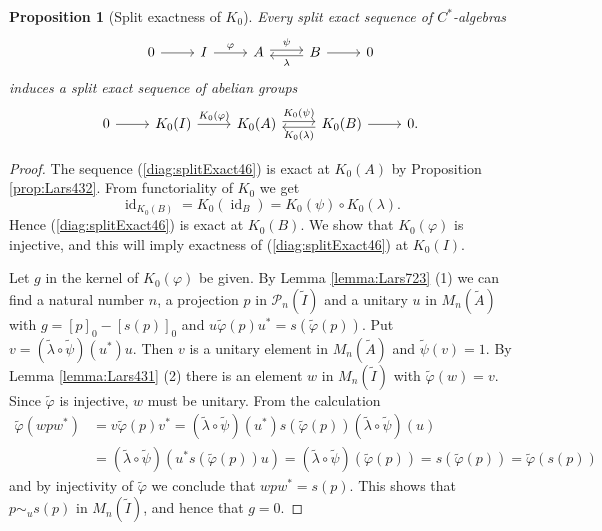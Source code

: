 \documentclass{book}
\newtheorem{proposition}[definition]{Proposition}
\def\cstars{\(C^*\)-algebras}
\begin{document}
\begin{proposition}[Split exactness of \(K_0\)]\label{prop:Lars433}
  Every split exact sequence of \cstars
  \begin{equation*}
    \begin{tikzcd}
      0 \arrow[r]&I\arrow[r,"\varphi"] & A\arrow[r, shift left=2pt, "\psi"]
      &B\arrow[l, shift left=2pt, "\lambda"]\arrow[r]&0
    \end{tikzcd}
  \end{equation*}  
  induces a split exact sequence of abelian groups
  \begin{equation}\label{diag:splitExact46}
    \begin{tikzcd}
      0 \arrow[r]&K_0(I)\arrow[r,"K_0(\varphi)"] & K_0(A)\arrow[r, shift left=2pt, "K_0(\psi)"]
      &K_0(B)\arrow[l, shift left=2pt, "K_0(\lambda)"]\arrow[r]&0.
    \end{tikzcd}
  \end{equation}
\end{proposition}
\begin{proof}
  The sequence (\ref{diag:splitExact46}) is exact at \(K_0(A)\) by Proposition \ref{prop:Lars432}. From 
  functoriality of \(K_0\) we get
  \[
    \operatorname{id}_{K_0(B)}=K_0(\operatorname{id}_B)=K_0(\psi)\circ K_0(\lambda).
  \]
  Hence (\ref{diag:splitExact46}) is exact at \(K_0(B)\). We show that \(K_0(\varphi)\) is injective, and this will imply exactness of (\ref{diag:splitExact46}) at \(K_0(I)\).\par
  Let \(g\) in the kernel of \(K_0(\varphi)\) be given. By Lemma \ref{lemma:Lars723} (1) we can find a natural number \(n\),
  a projection \(p\) in \(\mathcal{P}_n(\tilde{I})\) and a unitary \(u\) in \(M_n(\tilde{A})\) with 
  \(g={[p]}_0-{[s(p)]}_0\) and \(u\tilde{\varphi}(p)u^*=s(\tilde{\varphi}(p))\).
  Put \(v=(\tilde{\lambda}\circ\tilde{\psi})(u^*)u\). Then \(v\) is a unitary element in \(M_n(\tilde{A})\) and
  \(\tilde{\psi}(v)=1\). By Lemma \ref{lemma:Lars431} (2) there is an element \(w\) in \(M_n(\tilde{I})\) with
  \(\tilde{\varphi}(w)=v\). Since \(\tilde{\varphi}\) is injective, \(w\) must be unitary. From the calculation
  \begin{align*}
    \tilde{\varphi}(wpw^*)&=v\tilde{\varphi}(p)v^*=(\tilde{\lambda}\circ\tilde{\psi})(u^*)s(\tilde{\varphi}(p))(\tilde{\lambda}\circ\tilde{\psi})(u)\\
    &=(\tilde{\lambda}\circ\tilde{\psi})(u^*s(\tilde{\varphi}(p))u)=(\tilde{\lambda}\circ\tilde{\psi})(\tilde{\varphi}(p))=s(\tilde{\varphi}(p))=\tilde{\varphi}(s(p))
  \end{align*}
  and by injectivity of \(\tilde{\varphi}\) we conclude that \(wpw^*=s(p)\). This shows that \(p\sim_u s(p)\) in \(M_n(\tilde{I})\), and hence that \(g=0\).
\end{proof}
\end{document}
